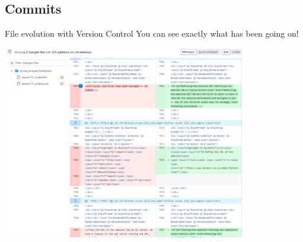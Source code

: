 \documentclass[xcolor=x11names,compress]{beamer}
\renewcommand{\(}{\begin{columns}}
\renewcommand{\)}{\end{columns}}
\newcommand{\<}[1]{\begin{column}{#1}}
\renewcommand{\>}{\end{column}}
\begin{document}
\subsection{Commits}

\begin{frame}{File evolution  \textcolor{brique}{with Version Control}  }
You can see exactly what has been going on!
\begin{center}
\begin{itemize}
    {\includegraphics[width = 0.8\textwidth]{GitHubDiff.png} \\ }
\end{itemize}
\end{center}
\end{frame}
\end{document}

